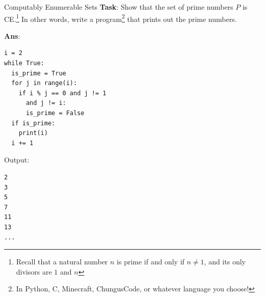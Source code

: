 \documentclass{beamer}
\begin{document}
\begin{frame}[fragile]{Computably Enumerable Sets}
\textbf{Task}: Show that the set of prime numbers $P$ is CE.\footnote{Recall that a natural number $n$ is prime if and only if $n \neq 1$, and its only divisors are $1$ and $n$} In other words, write a program\footnote{In Python, C, Minecraft, ChungusCode, or whatever language you choose!} that prints out the prime numbers.

\pause

\textbf{Ans}:

\vspace{3mm}

\begin{minipage}{0.6\textwidth}
\begin{verbatim}
i = 2
while True:
  is_prime = True
  for j in range(i):
    if i % j == 0 and j != 1 
      and j != i:
      is_prime = False
  if is_prime:
    print(i)
  i += 1
\end{verbatim}
\end{minipage}
\begin{minipage}{0.3\textwidth}
Output:
\begin{verbatim}
2
3
5
7
11
13
...
\end{verbatim}
\end{minipage}
\end{frame}
\end{document}
